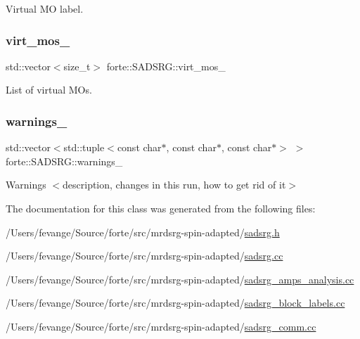 Virtual MO label. 

\mbox{\label{classforte_1_1_s_a_d_s_r_g_a52e25c282a710e0b89d941b1fa19930d}} 
\subsubsection{\texorpdfstring{virt\+\_\+mos\+\_\+}{virt\_mos\_}}
{\footnotesize\ttfamily std\+::vector$<$size\+\_\+t$>$ forte\+::\+S\+A\+D\+S\+R\+G\+::virt\+\_\+mos\+\_\+\hspace{0.3cm}{\ttfamily [protected]}}



List of virtual M\+Os. 

\mbox{\label{classforte_1_1_s_a_d_s_r_g_ae8c39450caaed74164872767883e59bd}} 
\subsubsection{\texorpdfstring{warnings\+\_\+}{warnings\_}}
{\footnotesize\ttfamily std\+::vector$<$std\+::tuple$<$const char$\ast$, const char$\ast$, const char$\ast$$>$ $>$ forte\+::\+S\+A\+D\+S\+R\+G\+::warnings\+\_\+\hspace{0.3cm}{\ttfamily [protected]}}



Warnings $<$description, changes in this run, how to get rid of it$>$ 



The documentation for this class was generated from the following files\+:\begin{DoxyCompactItemize}
\item 
/\+Users/fevange/\+Source/forte/src/mrdsrg-\/spin-\/adapted/\mbox{\hyperlink{sadsrg_8h}{sadsrg.\+h}}\item 
/\+Users/fevange/\+Source/forte/src/mrdsrg-\/spin-\/adapted/\mbox{\hyperlink{sadsrg_8cc}{sadsrg.\+cc}}\item 
/\+Users/fevange/\+Source/forte/src/mrdsrg-\/spin-\/adapted/\mbox{\hyperlink{sadsrg__amps__analysis_8cc}{sadsrg\+\_\+amps\+\_\+analysis.\+cc}}\item 
/\+Users/fevange/\+Source/forte/src/mrdsrg-\/spin-\/adapted/\mbox{\hyperlink{sadsrg__block__labels_8cc}{sadsrg\+\_\+block\+\_\+labels.\+cc}}\item 
/\+Users/fevange/\+Source/forte/src/mrdsrg-\/spin-\/adapted/\mbox{\hyperlink{sadsrg__comm_8cc}{sadsrg\+\_\+comm.\+cc}}\end{DoxyCompactItemize}
